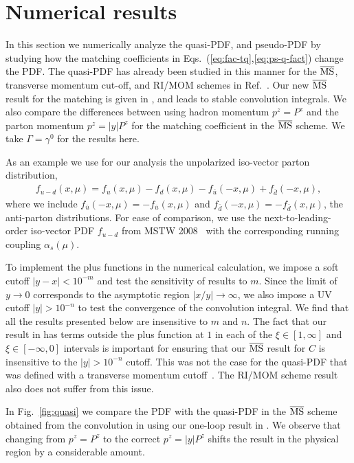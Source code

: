 \section{Numerical results}
\label{sec:num}

In this section we numerically analyze the quasi-PDF, \spcorr and pseudo-PDF by studying how the matching coefficients in Eqs.~(\ref{eq:fac-tq},\ref{eq:ps-q-fact}) change the PDF. The quasi-PDF has already been studied in this manner for the $\overline{\rm MS}$, transverse momentum cut-off, and RI/MOM schemes in Ref.~\cite{Stewart:2017tvs}. Our  new $\overline{\rm MS}$ result for the matching is given in , and leads to stable convolution integrals.  We also compare the differences between using hadron momentum $p^z=P^z$ and the parton momentum $p^z=|y|P^z$ for the matching coefficient in the $\overline{\rm MS}$ scheme. We take $\Gamma =\gamma^0$ for the results here.

As an example we use for our analysis the unpolarized iso-vector parton distribution,
\begin{align}
f_{u-d}(x,\mu) =  f_u(x,\mu) - f_d(x,\mu) - f_{\bar{u}}(-x,\mu) +  f_{\bar{d}}(-x,\mu),
\end{align}
where we include
$f_{\bar{u}}(-x,\mu) = - f_{\bar{u}}(x,\mu)$ and $f_{\bar{d}}(-x,\mu) = - f_{\bar{d}}(x,\mu)$, the anti-parton distributions. For ease of comparison, we use the next-to-leading-order iso-vector PDF $f_{u-d}$ from MSTW 2008~\cite{Martin:2009iq} with the corresponding running coupling $\alpha_s(\mu)$.

To implement the plus functions in the numerical calculation, we impose a soft cutoff $|y-x|<10^{-m}$ and test the sensitivity of results to $m$. Since the limit of $y\to0$ corresponds to the asymptotic region $|x/y|\to\infty$, we also impose a UV cutoff $|y|>10^{-n}$ to test the convergence of the convolution integral. We find that all the results presented below are insensitive to $m$ and $n$. The fact that our result in  has terms outside the plus function at $1$ in each of the $\xi\in [1,\infty]$ and $\xi\in [-\infty,0]$ intervals is important for ensuring that our $\overline{\rm MS}$ result for $C$ is insensitive to the $|y|>10^{-n}$ cutoff. This was not the case for the quasi-PDF that was defined with a transverse momentum cutoff~\cite{Xiong:2013bka}. The RI/MOM scheme result~\cite{Stewart:2017tvs} also does not suffer from this issue.

In Fig.~\ref{fig:quasi} we compare the PDF with the quasi-PDF in the $\overline{\rm MS}$ scheme obtained from the convolution in  using our one-loop result in . We observe that changing from $p^z=P^z$  to the correct $p^z=|y|P^z$ shifts the result in the physical region by a considerable amount.

